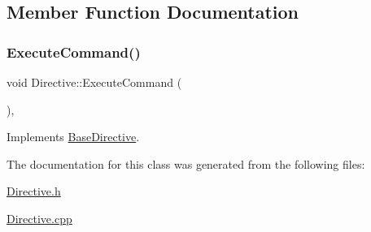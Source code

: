 \subsection{Member Function Documentation}
\mbox{\label{class_directive_a4297adea8d9504bb3b863829cea1b286}} 
\subsubsection{\texorpdfstring{ExecuteCommand()}{ExecuteCommand()}}
{\footnotesize\ttfamily void Directive\+::\+Execute\+Command (\begin{DoxyParamCaption}{ }\end{DoxyParamCaption})\hspace{0.3cm}{\ttfamily [override]}, {\ttfamily [virtual]}}



Implements \mbox{\hyperlink{class_base_directive_ad831e5fde8d6efddaad1cec04075f3cd}{Base\+Directive}}.



The documentation for this class was generated from the following files\+:\begin{DoxyCompactItemize}
\item 
\mbox{\hyperlink{_directive_8h}{Directive.\+h}}\item 
\mbox{\hyperlink{_directive_8cpp}{Directive.\+cpp}}\end{DoxyCompactItemize}
